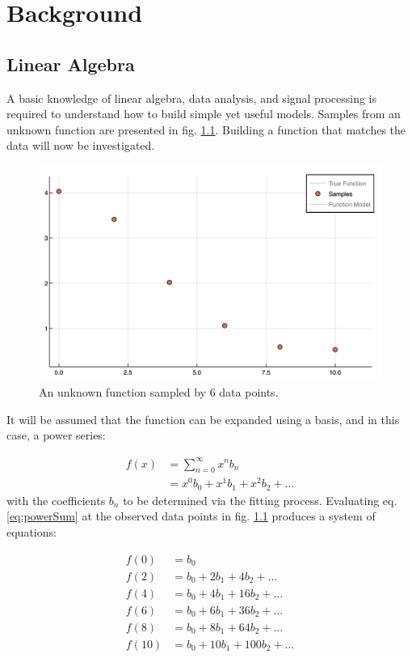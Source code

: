 \chapter{Background}\label{Sect:background}
\section{Linear Algebra}\label{Sect:linearAlgebra}
A basic knowledge of linear algebra, data analysis, and signal processing is required to understand how to build simple yet useful models. Samples from an unknown function are presented in fig. \ref{fig:func1Samples}. Building a function that matches the data will now be investigated.

\begin{figure}%
\centering
\includegraphics[scale = 0.6]{Figures/func1Samples}
\caption{An unknown function sampled by 6 data points.
\label{fig:func1Samples}} 
\end{figure}

\par It will be assumed that the function can be expanded using a basis, and in this case, a power series:

\begin{align}
f(x) &= \sum_{n=0}^\infty x^n b_n
	\label{eq:powerSum}\\ 
&= x^0b_0 + x^1b_1 + x^2b_2 + \ldots
	\label{eq:powerSeries}
\end{align}
with the coefficients $b_n$ to be determined via the fitting process. Evaluating eq. \ref{eq:powerSum} at the observed data points in fig. \ref{fig:func1Samples} produces a system of equations:

\begin{align}
f(0) &= b_0 \nonumber \\
f(2) &= b_0 + 2 b_1 + 4 b_2 + \dots \nonumber \\
f(4) &= b_0 + 4 b_1 + 16 b_2 + \dots \nonumber \\
f(6) &= b_0 + 6 b_1 + 36 b_2 + \dots \nonumber \\
f(8) &= b_0 + 8 b_1 + 64 b_2 + \dots \nonumber \\
f(10) &= b_0 + 10 b_1 + 100 b_2 + \dots\\
\end{align}

